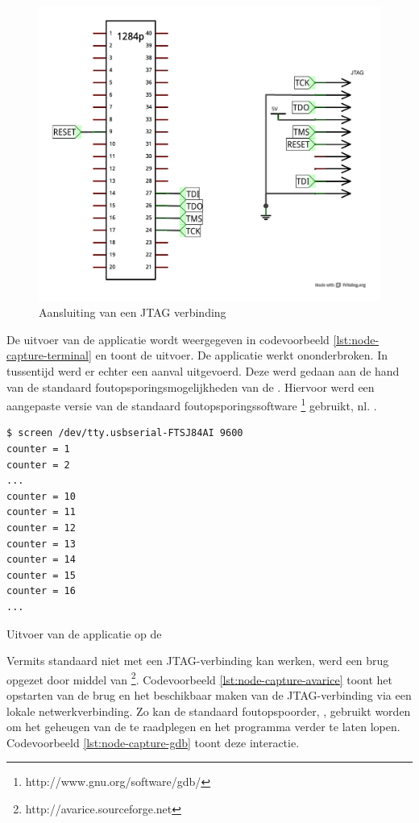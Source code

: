 \begin{figure}[ht]
  \centering
  \includegraphics[width=0.7\linewidth]{resources/node-capture-jtag.pdf}
  \caption{Aansluiting van een JTAG verbinding}
  \label{fig:node-capture-jtag}
\end{figure}

De uitvoer van de applicatie wordt weergegeven in codevoorbeeld
\ref{lst:node-capture-terminal} en toont de uitvoer. De applicatie werkt
ononderbroken. In tussentijd werd er echter een aanval uitgevoerd. Deze werd
gedaan aan de hand van de standaard foutopsporingsmogelijkheden van de \mcu.
Hiervoor werd een aangepaste versie van de standaard foutopsporingssoftware
\footnote{http://www.gnu.org/software/gdb/} gebruikt, nl.
.

\begin{listing}[ht]
  \begin{verbatim}
$ screen /dev/tty.usbserial-FTSJ84AI 9600
counter = 1
counter = 2
...
counter = 10
counter = 11
counter = 12
counter = 13
counter = 14
counter = 15
counter = 16
...
\end{verbatim}
  \caption{Uitvoer van de applicatie op de \mcu}
  \label{lst:node-capture-terminal}
\end{listing}

Vermits  standaard niet met een JTAG-verbinding kan werken, werd een
brug opgezet door middel van
\footnote{http://avarice.sourceforge.net}. Codevoorbeeld
\ref{lst:node-capture-avarice} toont het opstarten van de brug en het
beschikbaar maken van de JTAG-verbinding via een lokale netwerkverbinding. Zo
kan de standaard foutopspoorder, , gebruikt worden om het geheugen van
de \mcu te raadplegen en het programma verder te laten lopen. Codevoorbeeld
\ref{lst:node-capture-gdb} toont deze interactie.

